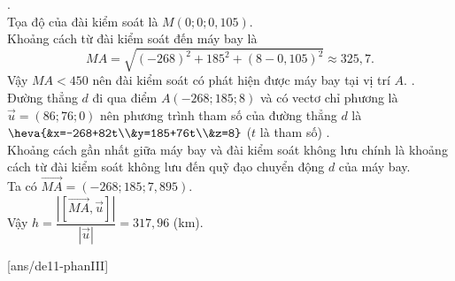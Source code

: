 \begin{ex}
{\begin{itemchoice}
			.\\
			Tọa độ của đài kiểm soát là $M(0;0;0{,}105)$.\\
			Khoảng cách từ đài kiểm soát đến máy bay là
			$$
			MA=\sqrt{(-268)^2+185^2+(8-0{,}105)^2}\approx 325{,}7.
			$$
			Vậy $MA<450$ nên đài kiểm soát có phát hiện được máy bay tại vị trí $A$.
			.\\
			Đường thẳng $d$ đi qua điểm $A(-268;185;8)$ và có vectơ chỉ phương là $\overrightarrow{u}=(86;76;0)$ nên phương trình tham số của đường thẳng $d$ là $\heva{&x=-268+82t\\&y=185+76t\\&z=8}$ ($t$ là tham số)
			.\\
			Khoảng cách gần nhất giữa máy bay và đài kiểm soát không lưu chính là khoảng cách từ đài kiểm soát không lưu đến quỹ đạo chuyển động $d$ của máy bay.\\
			Ta có $\overrightarrow{MA}=(-268;185;7{,}895)$.\\
			Vậy $h=\dfrac{\left|\left[\overrightarrow{MA},\overrightarrow{u}\right]\right|}{|\overrightarrow{u}|}=317{,}96$ (km).
		\end{itemchoice}
	}
\end{ex}
\TNSA
{}[ans/de11-phanIII]
